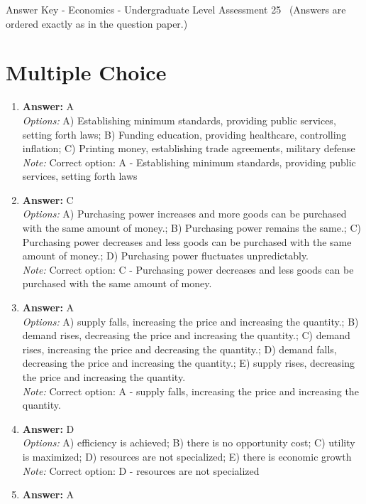 \documentclass[12pt]{article}
\begin{document}
\begin{center}
Answer Key - Economics - Undergraduate Level Assessment 25 \
\small (Answers are ordered exactly as in the question paper.)
\end{center}

\section*{Multiple Choice}
\begin{enumerate}[label=\arabic*.]
\item \textbf{Answer:} A
\\ \textit{Options:} A) Establishing minimum standards, providing public services, setting forth laws; B) Funding education, providing healthcare, controlling inflation; C) Printing money, establishing trade agreements, military defense
\\ \textit{Note:} Correct option: A - Establishing minimum standards, providing public services, setting forth laws
\item \textbf{Answer:} C
\\ \textit{Options:} A) Purchasing power increases and more goods can be purchased with the same amount of money.; B) Purchasing power remains the same.; C) Purchasing power decreases and less goods can be purchased with the same amount of money.; D) Purchasing power fluctuates unpredictably.
\\ \textit{Note:} Correct option: C - Purchasing power decreases and less goods can be purchased with the same amount of money.
\item \textbf{Answer:} A
\\ \textit{Options:} A) supply falls, increasing the price and increasing the quantity.; B) demand rises, decreasing the price and increasing the quantity.; C) demand rises, increasing the price and decreasing the quantity.; D) demand falls, decreasing the price and increasing the quantity.; E) supply rises, decreasing the price and increasing the quantity.
\\ \textit{Note:} Correct option: A - supply falls, increasing the price and increasing the quantity.
\item \textbf{Answer:} D
\\ \textit{Options:} A) efficiency is achieved; B) there is no opportunity cost; C) utility is maximized; D) resources are not specialized; E) there is economic growth
\\ \textit{Note:} Correct option: D - resources are not specialized
\item \textbf{Answer:} A

\end{enumerate}
\end{document}
